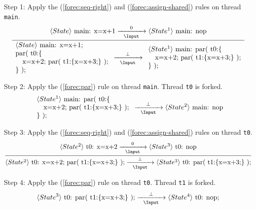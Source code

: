 \noindent
Step 1: Apply the (\ref{forec:seq-right}) and (\ref{forec:assign-shared}) rules 
on thread \verb$main$.
\begin{equation*}
	\frac{
			\langle State \rangle ~ \text{main: x=x+1}
				\xrightarrow[~~\Input~~]{0} 
			\langle State^1 \rangle ~ \text{main: nop}
		}{
			\begin{array}{l}
				\langle State \rangle ~ \text{main: x=x+1;}	\\
				\text{par( t0:\{}							\\
				\text{~~~x=x+2; par( t1:\{x=x+3;\} );}		\\
				\text{\} );}								
			\end{array}
				\xrightarrow[~~\Input~~]{\bot} 
			\begin{array}{l}
				\langle State^1 \rangle ~ \text{main: par( t0:\{}	\\
				\text{~~~x=x+2; par( t1:\{x=x+3;\} );}				\\
				\text{\} );}								
			\end{array}
		}
\end{equation*}

\noindent
Step 2: Apply the (\ref{forec:par}) rule on thread \verb$main$.
Thread \verb$t0$ is forked.
\begin{equation*}
	\begin{array}{l}
		\langle State^1 \rangle ~ \text{main: par( t0:\{}	\\
		\text{~~~x=x+2; par( t1:\{x=x+3;\} );}				\\
		\text{\} );}
	\end{array}
		\xrightarrow[~~\Input~~]{\bot} 
	\langle State^2 \rangle ~ \text{main: nop}
\end{equation*}

\noindent
Step 3: Apply the (\ref{forec:seq-right}) and (\ref{forec:assign-shared})
rules on thread \verb$t0$.
\begin{equation*}
	\frac{
			\langle State^2 \rangle ~ \text{t0: x=x+2}
				\xrightarrow[~~\Input~~]{0} 
			\langle State^3 \rangle ~ \text{t0: nop}
		}{
			\langle State^2 \rangle ~ \text{t0:	x=x+2; par( t1:\{x=x+3;\} );}
				\xrightarrow[~~\Input~~]{\bot} 
			\langle State^3 \rangle ~ \text{t0:	par( t1:\{x=x+3;\} );}
		}
\end{equation*}

\noindent
Step 4: Apply the (\ref{forec:par}) rule on thread \verb$t0$.
Thread \verb$t1$ is forked.
\begin{equation*}
	\langle State^3 \rangle ~ \text{t0: par( t1:\{x=x+3;\} );}
		\xrightarrow[~~\Input~~]{\bot} 
	\langle State^4 \rangle ~ \text{t0: nop;}
\end{equation*}

